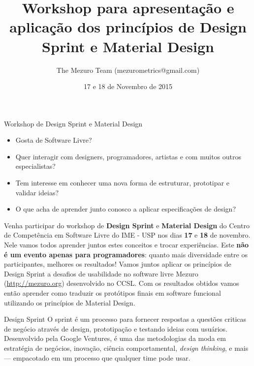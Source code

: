 \documentclass[final]{beamer} %
\title[Design Sprint \& Material Design]{Workshop para apresentação e aplicação dos princípios de Design Sprint e Material Design}
\author[Mezuro]{The Mezuro Team (mezurometrics@gmail.com)}
\institute[CCSL - IME - USP]{Centro de Competência em Software Livre, Instituto de Matemática e Estatística da universidade de São Paulo}
\date{17 e 18 de Novembro de 2015}
\begin{document}
  \begin{frame}{}
    \begin{center}
      \veryHuge Workshop de Design Sprint e Material Design
    \end{center}
    \begin{center}
      \begin{minipage}{0.75\textwidth}
        \begin{exampleblock}{}
          \begin{itemize}
            \large
            \item Gosta de Software Livre?
            \item Quer interagir com designers, programadores, artistas e com muitos outros especialistas?
            \item Tem interesse em conhecer uma nova forma de estruturar, prototipar e validar ideias?
            \item O que acha de aprender junto conosco a aplicar especificações de design?
          \end{itemize}
        \end{exampleblock}
      \end{minipage}
    \end{center}
    \vfill
    {\large Venha participar do workshop de \textbf{Design Sprint} e \textbf{Material Design} do Centro de Competência em Software Livre do IME - USP nos dias \textbf{17} e \textbf{18} de novembro. Nele vamos todos aprender juntos estes conceitos e trocar experiências. Este \textbf{não é um evento apenas para programadores}: quanto mais diversidade entre os participantes, melhores os resultados!}
    \vfill
    {\large Vamos juntos aplicar os princípios de Design Sprint a desafios de usabilidade no software livre Mezuro (\url{http://mezuro.org}) desenvolvido no CCSL. Com os resultados obtidos vamos então aprender como traduzir os protótipos finais em software funcional utilizando os princípios de Material Design.}
    \vfill
    \begin{block}{\large Design Sprint}
      O sprint é um processo para fornecer respostas a questões criticas de negócio através de design, prototipação e testando ideias com usuários. Desenvolvido pela Google Ventures, é uma das metodologias da moda em estratégia de negócios, inovação, ciência comportamental, \textit{design thinking}, e mais — empacotado em um processo que qualquer time pode usar.


\end{block}
\end{frame}
\end{document}
